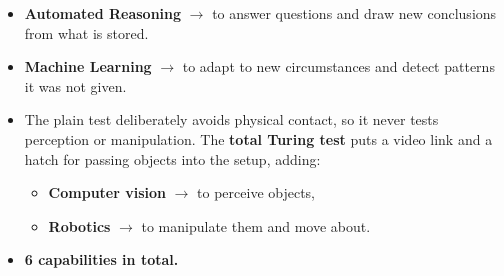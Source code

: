 {\begin{itemize}
        is told during the interview.
  \item \textbf{Automated Reasoning} $\rightarrow$ to answer questions and draw new
        conclusions from what is stored.
  \item \textbf{Machine Learning} $\rightarrow$ to adapt to new circumstances and detect
        patterns it was not given.
\end{itemize}
\begin{itemize}
  \item The plain test deliberately avoids physical contact, so it never tests perception
        or manipulation. The \textbf{total Turing test} puts a video link and a hatch for
        passing objects into the setup, adding:
  \begin{itemize}
    \item \textbf{Computer vision} $\rightarrow$ to perceive objects,
    \item \textbf{Robotics} $\rightarrow$ to manipulate them and move about.
  \end{itemize}
  \item \textbf{6 capabilities in total.} 
\end{itemize}}

\vspace{2pt}

